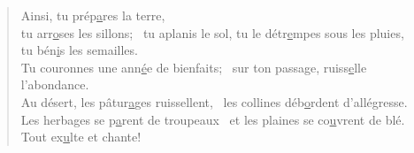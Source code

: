 \begin{verse}
Ainsi, tu prép\underline{a}res la terre, \\
tu arr\underline{o}ses les sillons;~\psalmstar
tu aplanis le sol, tu le détr\underline{e}mpes sous les pluies, \\
tu bén\underline{i}s les semailles. \\

Tu couronnes une ann\underline{é}e de bienfaits;~\psalmstar
sur ton passage, ruiss\underline{e}lle l’abondance. \\
Au désert, les pâtur\underline{a}ges ruissellent,~\psalmstar
les collines déb\underline{o}rdent d’allégresse. \\

Les herbages se p\underline{a}rent de troupeaux~\psalmdagger
et les plaines se co\underline{u}vrent de blé.~\psalmstar
Tout ex\underline{u}lte et chante! \\
\end{verse}

